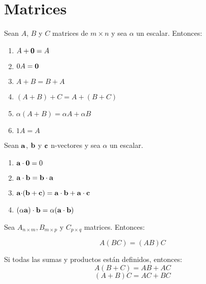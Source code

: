 \documentclass[alge.tex]{subfiles}
\begin{document}
\maketitle
\section{Matrices}
\begin{teo}
  Sean \(A\), \(B\) y \(C\) matrices de \(m \times n\) y sea \(\alpha\)
  un escalar. Entonces:
  \begin{enumerate}
  \item \(A + \mathbf{0} = A\)
  \item \(0A = \mathbf{0}\)
  \item \(A + B = B + A\)
  \item \((A + B) + C = A + (B + C)\)
  \item \(\alpha(A+B)=\alpha A + \alpha B\)
  \item \(1A=A\)
  \end{enumerate}
\end{teo}

\begin{teo}
  Sean \(\mathbf{a}\), \(\mathbf{b}\) y \(\mathbf{c}\) n-vectores y sea
  \(\alpha\) un escalar.
  \begin{enumerate}
  \item \( \mathbf{a \cdot 0} = 0 \)
  \item \( \mathbf{a \cdot b} = \mathbf{b \cdot a}\)
  \item \( \mathbf{a \cdot} ( \mathbf{b} + \mathbf{c}) = \mathbf{a \cdot
      b} + \mathbf{ a \cdot c}\)
  \item \((\alpha \mathbf{a}) \cdot \mathbf{b} = \alpha (\mathbf{a}
    \cdot \mathbf{b})\)
  \end{enumerate}
\end{teo}

\begin{teo}\label{teoAsoc}
  Sea \(A_{n \times m}, B_{m \times p} \mbox{ y }  C_{p \times q}\)
  matrices. Entonces:

  \[ A(BC) = (AB)C\]

\end{teo}

\begin{teo}\label{teoDistM}
  Si todas las sumas y productos est\'an definidos, entonces:
  \[A(B+C)=AB+AC \]
  \[(A+B)C=AC+BC \]
\end{teo}
\vspace{.25cm}
\end{document}
